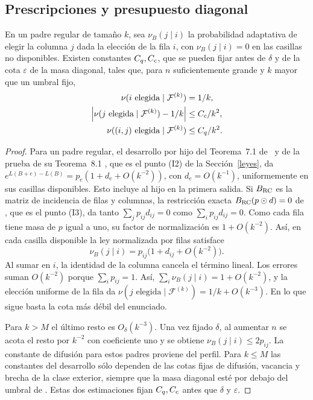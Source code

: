\subsection{Prescripciones y presupuesto diagonal}
\begin{lema}\label{meso:paso}
En un padre regular de tamaño $k$, sea $\nu_B(j\mid i)$ la probabilidad adaptativa de elegir la
columna $j$ dada la elección de la fila $i$, con $\nu_B(j\mid i)=0$ en las casillas no disponibles.
Existen constantes $C_q,C_{\rm c}$, que se pueden fijar antes de $\delta$ y de la cota $\varepsilon$
de la masa diagonal, tales que, para $n$ suficientemente grande y $k$ mayor que un umbral fijo,
\begin{align*}
 \nu(i\text{ elegida}\mid\mathcal F^{(k)})&=1/k,\\
 \left|\nu(j\text{ elegida}\mid\mathcal F^{(k)})-1/k\right|&\le C_{\rm c}/k^2,\\
 \nu((i,j)\text{ elegida}\mid\mathcal F^{(k)})&\le C_q/k^2 .
\end{align*}
\end{lema}
\begin{proof}
Para un padre regular, el desarrollo por hijo del Teorema~7.1 de~\cite{pred} y de la prueba de su
Teorema~8.1 \cite[Secciones~7.8, 8.2 y~8.5]{pred}, que es el punto (I2) de la Sección~\ref{leyes}, da
$e^{L(B+e)-L(B)}=p_e(1+d_e+O(k^{-2}))$, con
$d_e=O(k^{-1})$, uniformemente en sus casillas disponibles. Esto incluye al hijo en la primera salida.
Si $B_{\rm RC}$ es la matriz de incidencia de filas y columnas, la restricción exacta
$B_{\rm RC}(p\odot d)=0$ de \cite[Sección~6.1]{pred}, que es el punto (I3), da tanto
$\sum_jp_{ij}d_{ij}=0$ como
$\sum_i p_{ij}d_{ij}=0$. Como cada fila tiene masa de $p$ igual a uno, su factor de normalización
es $1+O(k^{-2})$. Así, en cada casilla disponible la ley normalizada por filas satisface
\[
 \nu_B(j\mid i)=p_{ij}\bigl(1+d_{ij}+O(k^{-2})\bigr).
\]
Al sumar en $i$, la identidad de la columna cancela el término lineal. Los errores suman $O(k^{-2})$
porque $\sum_i p_{ij}=1$. Así, $\sum_i\nu_B(j\mid i)=1+O(k^{-2})$, y la elección uniforme de la fila da
$\nu(j\text{ elegida}\mid\mathcal F^{(k)})=1/k+O(k^{-3})$. En lo que sigue basta la cota más débil
del enunciado.

Para $k>M$ el último resto es $O_\delta(k^{-3})$. Una vez fijado $\delta$, al aumentar $n$ se acota
el resto por $k^{-2}$ con coeficiente uno y se obtiene $\nu_B(j\mid i)\le2p_{ij}$. La constante de
difusión para estos padres proviene del perfil. Para $k\le M$ las constantes del desarrollo sólo
dependen de las cotas fijas de difusión, vacancia y brecha de la clase exterior, siempre que la masa
diagonal esté por debajo del umbral de \cite[Teorema~8.1]{pred}. Estas dos estimaciones fijan
$C_q,C_{\rm c}$ antes que $\delta$ y $\varepsilon$.
\end{proof}

